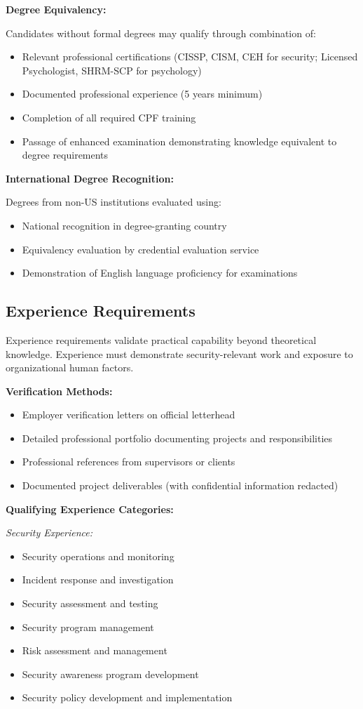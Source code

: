 \documentclass[11pt,a4paper]{article}
\begin{document}
\textbf{Degree Equivalency:}

Candidates without formal degrees may qualify through combination of:
\begin{itemize}
\item Relevant professional certifications (CISSP, CISM, CEH for security; Licensed Psychologist, SHRM-SCP for psychology)
\item Documented professional experience (5 years minimum)
\item Completion of all required CPF training
\item Passage of enhanced examination demonstrating knowledge equivalent to degree requirements
\end{itemize}

\textbf{International Degree Recognition:}

Degrees from non-US institutions evaluated using:
\begin{itemize}
\item National recognition in degree-granting country
\item Equivalency evaluation by credential evaluation service
\item Demonstration of English language proficiency for examinations
\end{itemize}

\subsection{Experience Requirements}

Experience requirements validate practical capability beyond theoretical knowledge. Experience must demonstrate security-relevant work and exposure to organizational human factors.

\textbf{Verification Methods:}
\begin{itemize}
\item Employer verification letters on official letterhead
\item Detailed professional portfolio documenting projects and responsibilities
\item Professional references from supervisors or clients
\item Documented project deliverables (with confidential information redacted)
\end{itemize}

\textbf{Qualifying Experience Categories:}

\textit{Security Experience:}
\begin{itemize}
\item Security operations and monitoring
\item Incident response and investigation
\item Security assessment and testing
\item Security program management
\item Risk assessment and management
\item Security awareness program development
\item Security policy development and implementation
\end{itemize}
\end{document}
